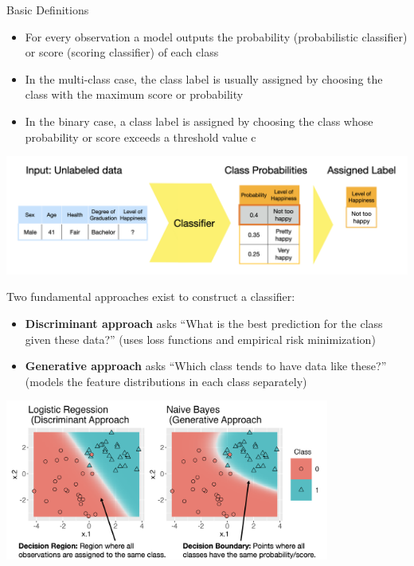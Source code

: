 \documentclass[11pt,compress,t,notes=noshow, xcolor=table]{beamer}
\begin{document}
\begin{vbframe}{Basic Definitions}
\begin{itemize}
\item \small For every observation a model outputs the probability (probabilistic classifier) or score (scoring classifier) of each class
\item \small In the multi-class case, the class label is usually assigned by choosing the class with the maximum score or probability
\item \small In the binary case, a class label is assigned by choosing the class whose probability or score exceeds a threshold value c
\end{itemize}

\vspace{5mm}

\begin{center}
  \includegraphics[width = \textwidth]{slides/supervised-classification/figure_man/nutshell-classification-label-assignment.png}
\end{center}

Two fundamental approaches exist to construct a classifier:
\begin{itemize}
\item \small \textbf{Discriminant approach} asks ``What is the best prediction for the class given these data?'' (uses loss functions and empirical risk minimization)
\item \small \textbf{Generative approach} asks ``Which class tends to have data like these?'' (models the feature distributions in each class separately)

\end{itemize}

\begin{center}
  \includegraphics[width = 0.8\textwidth]{slides/supervised-classification/figure_man/nutshell_classif_binary_task.png}
\end{center}
\end{vbframe}
\end{document}
